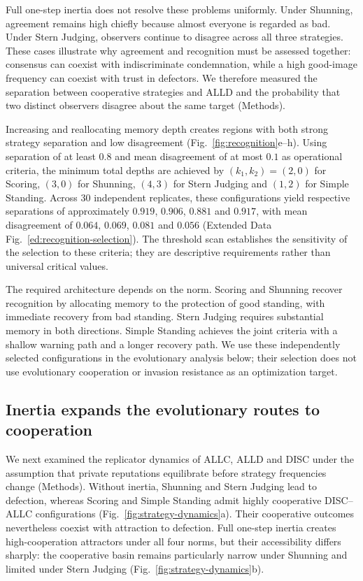 \documentclass[fleqn,10pt]{article}
\begin{document}
Full one-step inertia does not resolve these problems uniformly. Under Shunning, agreement remains high chiefly because almost everyone is regarded as bad. Under Stern Judging, observers continue to disagree across all three strategies. These cases illustrate why agreement and recognition must be assessed together: consensus can coexist with indiscriminate condemnation, while a high good-image frequency can coexist with trust in defectors. We therefore measured the separation between cooperative strategies and ALLD and the probability that two distinct observers disagree about the same target (Methods).

Increasing and reallocating memory depth creates regions with both strong strategy separation and low disagreement (Fig.~\ref{fig:recognition}e--h). Using separation of at least $0.8$ and mean disagreement of at most $0.1$ as operational criteria, the minimum total depths are achieved by $(k_1,k_2)=(2,0)$ for Scoring, $(3,0)$ for Shunning, $(4,3)$ for Stern Judging and $(1,2)$ for Simple Standing. Across 30 independent replicates, these configurations yield respective separations of approximately $0.919$, $0.906$, $0.881$ and $0.917$, with mean disagreement of $0.064$, $0.069$, $0.081$ and $0.056$ (Extended Data Fig.~\ref{ed:recognition-selection}). The threshold scan establishes the sensitivity of the selection to these criteria; they are descriptive requirements rather than universal critical values.

The required architecture depends on the norm. Scoring and Shunning recover recognition by allocating memory to the protection of good standing, with immediate recovery from bad standing. Stern Judging requires substantial memory in both directions. Simple Standing achieves the joint criteria with a shallow warning path and a longer recovery path. We use these independently selected configurations in the evolutionary analysis below; their selection does not use evolutionary cooperation or invasion resistance as an optimization target.

\subsection*{Inertia expands the evolutionary routes to cooperation}

We next examined the replicator dynamics of ALLC, ALLD and DISC under the assumption that private reputations equilibrate before strategy frequencies change (Methods). Without inertia, Shunning and Stern Judging lead to defection, whereas Scoring and Simple Standing admit highly cooperative DISC--ALLC configurations (Fig.~\ref{fig:strategy-dynamics}a). Their cooperative outcomes nevertheless coexist with attraction to defection. Full one-step inertia creates high-cooperation attractors under all four norms, but their accessibility differs sharply: the cooperative basin remains particularly narrow under Shunning and limited under Stern Judging (Fig.~\ref{fig:strategy-dynamics}b).
\end{document}
